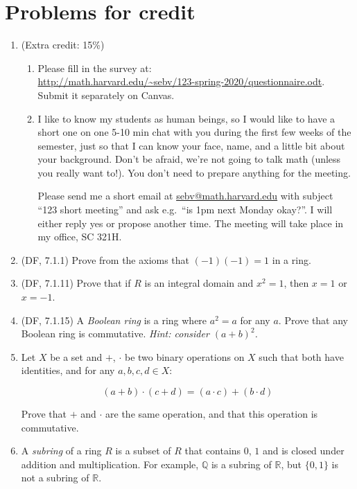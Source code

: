 \documentclass{amsart}
\theoremstyle{definition}
\newcommand{\Qq}{\mathbb{Q}}
\newcommand{\Rr}{\mathbb{R}}
\begin{document}
\section*{Problems for credit}

\begin{enumerate}
\item (Extra credit: 15\%) \begin{enumerate}
\item Please fill in the survey at: \\
  \url{http://math.harvard.edu/~sebv/123-spring-2020/questionnaire.odt}. Submit it separately on Canvas.
\item I like to know my students as human beings, so I would like to have a short one on one 5-10 min chat with you during the first few weeks of the semester, just so that I can know your face, name, and a little bit about your background. Don't be afraid, we're not going to talk math (unless you really want to!). You don't need to prepare anything for the meeting.

  Please send me a short email at \url{sebv@math.harvard.edu} with subject ``123 short meeting'' and ask e.g.\ ``is 1pm next Monday okay?''. I will either reply yes or propose another time. The meeting will take place in my office, SC 321H.
\end{enumerate}
\item (DF, 7.1.1) Prove from the axioms that $(-1)(-1) = 1$ in a ring.
\item (DF, 7.1.11) Prove that if $R$ is an integral domain and $x^2 = 1$, then $x = 1$ or $x = -1$.
\item (DF, 7.1.15) A \emph{Boolean ring} is a ring where $a^2 = a$ for any $a$. Prove that any Boolean ring is commutative. \emph{Hint: consider $(a + b)^2$.}
\item Let $X$ be a set and $+$, $\cdot$ be two binary operations on $X$ such that both have identities, and for any $a,b,c, d \in X$:

  $$
  (a + b) \cdot (c + d) = (a \cdot c) + (b \cdot d)
  $$

  Prove that $+$ and $\cdot$ are the same operation, and that this operation is commutative.

\item A \emph{subring} of a ring $R$ is a subset of $R$ that contains $0$, $1$ and is closed under addition and multiplication. For example, $\Qq$ is a subring of $\Rr$, but $\{0,1\}$ is not a subring of $\Rr$.


\end{enumerate}
\end{document}

